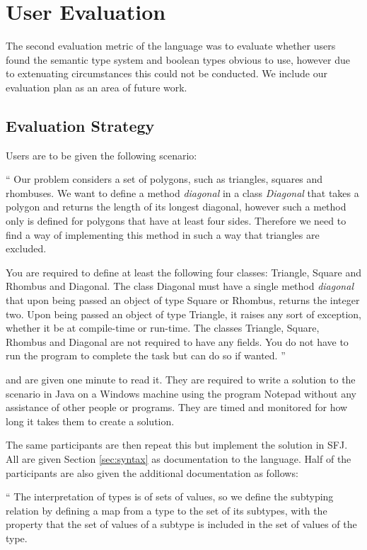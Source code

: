 \documentclass{l4proj}
\begin{document}
\section{User Evaluation}

The second evaluation metric of the language was to evaluate whether users found the semantic type system and boolean types obvious to use, however due to extenuating circumstances this could not be conducted.
We include our evaluation plan as an area of future work.

\subsection{Evaluation Strategy}

Users are to be given the following scenario:

``
Our problem considers a set of polygons, such as triangles, squares and rhombuses.
We want to define a method \emph{diagonal} in a class \emph{Diagonal} that takes a polygon and returns the length of its longest diagonal, however such a method only is defined for polygons that have at least four sides.
Therefore we need to find a way of implementing this method in such a way that triangles are excluded.

You are required to define at least the following four classes: Triangle, Square and Rhombus and Diagonal.
The class Diagonal must have a single method \emph{diagonal} that upon being passed an object of type Square or Rhombus, returns the integer two.
Upon being passed an object of type Triangle, it raises any sort of exception, whether it be at compile-time or run-time.
The classes Triangle, Square, Rhombus and Diagonal are not required to have any fields.
You do not have to run the program to complete the task but can do so if wanted.
''

and are given one minute to read it.
They are required to write a solution to the scenario in Java on a Windows machine using the program Notepad without any assistance of other people or programs.
They are timed and monitored for how long it takes them to create a solution.

The same participants are then repeat this but implement the solution in SFJ.
All are given Section \ref{sec:syntax} as documentation to the language.
Half of the participants are also given the additional documentation as follows:

``
The interpretation of types is of sets of values, so we define the subtyping relation by defining a map from a type to the set of its subtypes, with the property that the set of values of a subtype is included in the set of values of the type.
\end{document}
